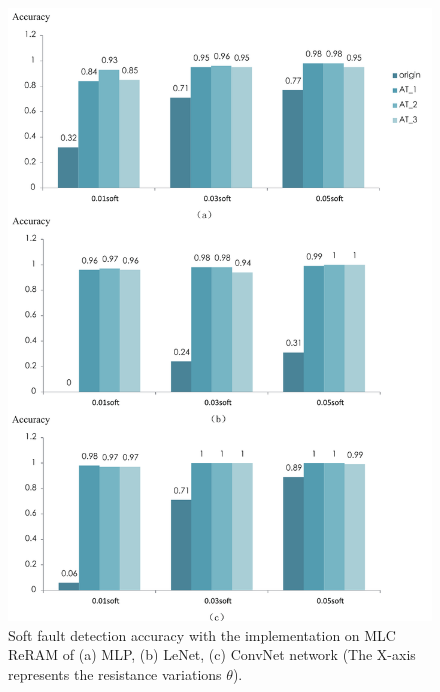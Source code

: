 \begin{figure}
    \centering
    \includegraphics[width=0.7\linewidth]{images/OL-fig12}
    \caption{Soft fault detection accuracy with the implementation on MLC ReRAM of (a) MLP, (b) LeNet, (c) ConvNet network (The X-axis represents the resistance variations $\theta$).}
    \label{fig:mlc-soft}
\end{figure}



